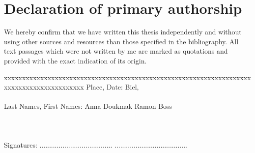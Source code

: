 \chapter*{Declaration of primary authorship}
\label{chap:declaration_authorship}

\vspace*{10mm} 

We hereby confirm that we have written this thesis independently and without using other sources and resources than those specified in the bibliography. All text passages which were not written by me are marked as quotations and provided with the exact indication of its origin. 

\vspace{15mm}

\begin{tabbing}
xxxxxxxxxxxxxxxxxxxxxxxxxxxxxx\=xxxxxxxxxxxxxxxxxxxxxxxxxxxxxx\=xxxxxxxxxxxxxxxxxxxxxxxxxxxxxx\kill
Place, Date:		\> Biel, \versiondate \\ \\ 
Last Names, First Names:	\> Anna Doukmak 	\> Ramon Boss \\ \\ \\ \\ 
Signatures:	\> ......................................\> ...................................... \\
\end{tabbing}

